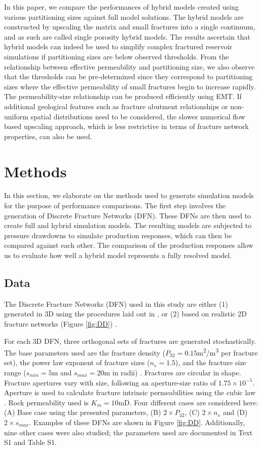 \documentclass[draft]{agujournal2018}
\begin{document}
In this paper, we compare the performances of hybrid models created using various partitioning sizes against full model solutions. The hybrid models are constructed by upscaling the matrix and small fractures into a single continuum, and as such are called single porosity hybrid models. The results ascertain that hybrid models can indeed be used to simplify complex fractured reservoir simulations if partitioning sizes are below observed thresholds. From the relationship between effective permeability and partitioning size, we also observe that the thresholds can be pre-determined since they correspond to partitioning sizes where the effective permeability of small fractures begin to increase rapidly. The permeability-size relationship can be produced efficiently using EMT. If additional geological features such as fracture abutment relationships or non-uniform spatial distributions need to be considered, the slower numerical flow based upscaling approach, which is less restrictive in terms of fracture network properties, can also be used.

\section{Methods}

In this section, we elaborate on the methods used to generate simulation models for the purpose of performance comparisons. The first step involves the generation of Discrete Fracture Networks (DFN). These DFNs are then used to create full and hybrid simulation models. The resulting models are subjected to pressure drawdowns to simulate production responses, which can then be compared against each other. The comparison of the production responses allow us to evaluate how well a hybrid model represents a fully resolved model.

\subsection{Data}
The Discrete Fracture Networks (DFN) used in this study are either (1) generated in 3D using the procedures laid out in \citet{Priest1993}, or (2) based on realistic 2D fracture networks (Figure \ref{fig:DD}) \citep{Bisdom2015, Bisdom2017}.

For each 3D DFN, three orthogonal sets of fractures are generated stochastically. The base parameters used are the fracture density ($P_{32}=0.15$m\textsuperscript{2}/m\textsuperscript{3} per fracture set), the power law exponent of fracture sizes ($n_s=1.5$), and the fracture size range ($s_{min}=5$m and $s_{max}=20$m in radii) \citep{Bonnet2001, Dershowitz1992}. Fractures are circular in shape. Fracture apertures vary with size, following an aperture-size ratio of $1.75\times 10^{-5}$. Aperture is used to calculate fracture intrinsic permeabilities using the cubic law \citep{Witherspoon1980}. Rock permeability used is $K_m=10$mD. Four different cases are considered here: (A) Base case using the presented parameters, (B) $2\times P_{32}$, (C) $2\times n_s$ and (D) $2\times s_{max}$. Examples of these DFNs are shown in Figure \ref{fig:DD}. Additionally, nine other cases were also studied; the parameters used are documented in Text S1 and Table S1.
\end{document}
